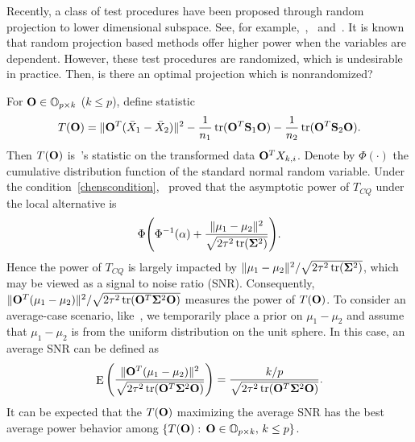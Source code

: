 \documentclass[review]{elsarticle}
\DeclareMathOperator{\mytr}{tr}
\DeclareMathOperator{\myE}{E}
\theoremstyle{plain}
\theoremstyle{definition}
\theoremstyle{remark}
\begin{document}
Recently, a class of test procedures have been proposed through random projection to lower dimensional subspace. See, for example,~\cite{Lopes2015A},~\cite{Thulin2014A} and~\cite{Srivastava2014RAPTT}.
It is known that random projection based methods offer higher power when the variables are dependent.
However, these test procedures are randomized, which is undesirable in practice.
Then, is there an optimal projection which is nonrandomized?

For $\mathbf{O}\in \mathbb{O}_{p\times k}$ ($k\leq p$), define statistic
$$
    T(\BO)=\|\BO^T(\bar{X}_1-\bar{X}_2)\|^2-\frac{1}{n_1}\mytr(\BO^T \BS_1\BO)-\frac{1}{n_2}\mytr(\BO^T \BS_2\BO).
$$
Then $T(\mathbf{O})$ is~\cite{Chen2010A}'s statistic on the transformed data $\mathbf{O}^T X_{k,i}$.
Denote by $\Phi(\cdot)$ the cumulative distribution function of the standard normal random variable.
Under the condition~\eqref{chenscondition},~\cite{Chen2010A} proved that the asymptotic power of $T_{CQ}$ under the local alternative is
$$
\Phi\Bigg(\Phi^{-1}(\alpha)+\frac{\|\mu_1-\mu_2\|^2}{\sqrt{2\tau^2\mytr(\bSigma^2)}}\Bigg).
$$
Hence the power of $T_{CQ}$ is largely impacted by $\|\mu_1-\mu_2\|^2/\sqrt{2\tau^2\mytr(\bSigma^2)}$, which may be viewed as a signal to noise ratio (SNR).
Consequently, $\|\BO^T (\mu_1-\mu_2)\|^2/\sqrt{2\tau^2\mytr(\BO^T \bSigma^2 \BO)}$ measures the power of $T(\mathbf{O})$.
To consider an average-case scenario, like~\cite{Lopes2015A}, we temporarily place a prior on $\mu_1-\mu_2$ and assume that $\mu_1-\mu_2$ is from the uniform distribution on the unit sphere.
In this case, an average SNR can be defined as
\begin{equation}\label{touteng}
\myE \Bigg( \frac{\|\BO^T (\mu_1-\mu_2)\|^2}{\sqrt{2\tau^2\mytr(\BO^T \bSigma^2 \BO)}}\Bigg)
=  \frac{k/p}{\sqrt{2\tau^2\mytr(\BO^T \bSigma^2 \BO)}}.
\end{equation}
It can be expected that the $T(\mathbf{O})$ maximizing the average SNR has the best average power behavior among $\{T(\mathbf{O}):\, \mathbf{O}\in \mathbb{O}_{p\times k},\,  k\leq p\}$.
\end{document}
